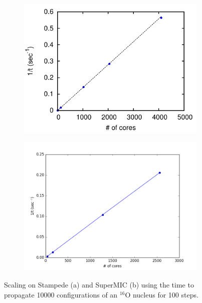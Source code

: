 \documentclass[12pt,letterpaper]{article}
\begin{document}
\begin{figure}[!htb]
\centering
\begin{subfigure}{.45\textwidth}
  \centering
  \includegraphics[width=\textwidth]{stampede.pdf}
  \caption{}
  \label{fig:stampede}
\end{subfigure}%
\hspace{0.01\textwidth}
\begin{subfigure}{.45\textwidth}
  \centering
  \includegraphics[width=\textwidth]{supermic.png}
  \caption{}
  \label{fig:supermic}
\end{subfigure}
\caption{Scaling on Stampede (a) and SuperMIC (b) using the time to propagate 
10000 configurations of an $^{16}$O nucleus for 100 steps.}
\label{fig:scaling}
\end{figure}
\end{document}

